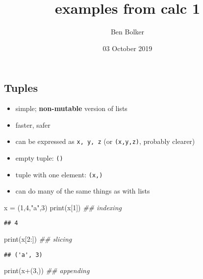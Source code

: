 \documentclass[]{tufte-handout}
\title{examples from calc 1}
\author{Ben Bolker}
\date{03 October 2019}
\newenvironment{Shaded}{}{}
\newcommand{\DecValTok}[1]{\textcolor[rgb]{0.25,0.63,0.44}{{#1}}}
\newcommand{\StringTok}[1]{\textcolor[rgb]{0.25,0.44,0.63}{{#1}}}
\newcommand{\CommentTok}[1]{\textcolor[rgb]{0.38,0.63,0.69}{\textit{{#1}}}}
\newcommand{\OperatorTok}[1]{\textcolor[rgb]{0.40,0.40,0.40}{{#1}}}
\newcommand{\BuiltInTok}[1]{{#1}}
\newcommand{\NormalTok}[1]{{#1}}
\providecommand{\tightlist}{%
  \setlength{\itemsep}{0pt}\setlength{\parskip}{0pt}}
\begin{document}
\maketitle




\subsection{Tuples}\label{tuples}

\begin{itemize}
\tightlist
\item
  simple; \textbf{non-mutable} version of lists
\item
  faster, safer
\item
  can be expressed as \texttt{x,\ y,\ z} (or \texttt{(x,y,z)}, probably
  clearer)
\item
  empty tuple: \texttt{()}
\item
  tuple with one element: \texttt{(x,)}
\item
  can do many of the same things as with lists
\end{itemize}

\begin{Shaded}
\begin{Highlighting}[]
\NormalTok{x }\OperatorTok{=} \NormalTok{(}\DecValTok{1}\NormalTok{,}\DecValTok{4}\NormalTok{,}\StringTok{"a"}\NormalTok{,}\DecValTok{3}\NormalTok{)}
\BuiltInTok{print}\NormalTok{(x[}\DecValTok{1}\NormalTok{])   }\CommentTok{## indexing}
\end{Highlighting}
\end{Shaded}

\begin{verbatim}
## 4
\end{verbatim}

\begin{Shaded}
\begin{Highlighting}[]
\BuiltInTok{print}\NormalTok{(x[}\DecValTok{2}\NormalTok{:])  }\CommentTok{## slicing}
\end{Highlighting}
\end{Shaded}

\begin{verbatim}
## ('a', 3)
\end{verbatim}

\begin{Shaded}
\begin{Highlighting}[]
\BuiltInTok{print}\NormalTok{(x}\OperatorTok{+}\NormalTok{(}\DecValTok{3}\NormalTok{,)) }\CommentTok{## appending}
\end{Highlighting}
\end{Shaded}
\end{document}
